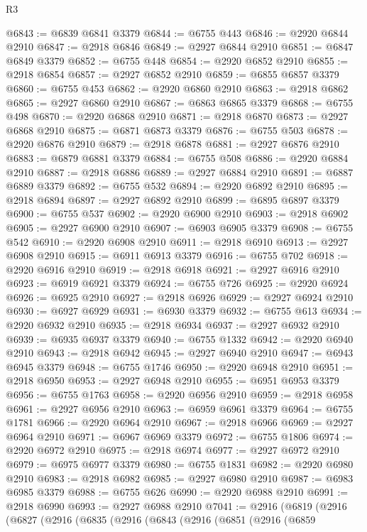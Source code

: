 \begin{lexlean}{R3}
\begin{coremodule}
@6843 := @6839 @6841 @3379
@6844 := @6755 @443
@6846 := @2920 @6844 @2910
@6847 := @2918 @6846
@6849 := @2927 @6844 @2910
@6851 := @6847 @6849 @3379
@6852 := @6755 @448
@6854 := @2920 @6852 @2910
@6855 := @2918 @6854
@6857 := @2927 @6852 @2910
@6859 := @6855 @6857 @3379
@6860 := @6755 @453
@6862 := @2920 @6860 @2910
@6863 := @2918 @6862
@6865 := @2927 @6860 @2910
@6867 := @6863 @6865 @3379
@6868 := @6755 @498
@6870 := @2920 @6868 @2910
@6871 := @2918 @6870
@6873 := @2927 @6868 @2910
@6875 := @6871 @6873 @3379
@6876 := @6755 @503
@6878 := @2920 @6876 @2910
@6879 := @2918 @6878
@6881 := @2927 @6876 @2910
@6883 := @6879 @6881 @3379
@6884 := @6755 @508
@6886 := @2920 @6884 @2910
@6887 := @2918 @6886
@6889 := @2927 @6884 @2910
@6891 := @6887 @6889 @3379
@6892 := @6755 @532
@6894 := @2920 @6892 @2910
@6895 := @2918 @6894
@6897 := @2927 @6892 @2910
@6899 := @6895 @6897 @3379
@6900 := @6755 @537
@6902 := @2920 @6900 @2910
@6903 := @2918 @6902
@6905 := @2927 @6900 @2910
@6907 := @6903 @6905 @3379
@6908 := @6755 @542
@6910 := @2920 @6908 @2910
@6911 := @2918 @6910
@6913 := @2927 @6908 @2910
@6915 := @6911 @6913 @3379
@6916 := @6755 @702
@6918 := @2920 @6916 @2910
@6919 := @2918 @6918
@6921 := @2927 @6916 @2910
@6923 := @6919 @6921 @3379
@6924 := @6755 @726
@6925 := @2920 @6924
@6926 := @6925 @2910
@6927 := @2918 @6926
@6929 := @2927 @6924 @2910
@6930 := @6927 @6929
@6931 := @6930 @3379
@6932 := @6755 @613
@6934 := @2920 @6932 @2910
@6935 := @2918 @6934
@6937 := @2927 @6932 @2910
@6939 := @6935 @6937 @3379
@6940 := @6755 @1332
@6942 := @2920 @6940 @2910
@6943 := @2918 @6942
@6945 := @2927 @6940 @2910
@6947 := @6943 @6945 @3379
@6948 := @6755 @1746
@6950 := @2920 @6948 @2910
@6951 := @2918 @6950
@6953 := @2927 @6948 @2910
@6955 := @6951 @6953 @3379
@6956 := @6755 @1763
@6958 := @2920 @6956 @2910
@6959 := @2918 @6958
@6961 := @2927 @6956 @2910
@6963 := @6959 @6961 @3379
@6964 := @6755 @1781
@6966 := @2920 @6964 @2910
@6967 := @2918 @6966
@6969 := @2927 @6964 @2910
@6971 := @6967 @6969 @3379
@6972 := @6755 @1806
@6974 := @2920 @6972 @2910
@6975 := @2918 @6974
@6977 := @2927 @6972 @2910
@6979 := @6975 @6977 @3379
@6980 := @6755 @1831
@6982 := @2920 @6980 @2910
@6983 := @2918 @6982
@6985 := @2927 @6980 @2910
@6987 := @6983 @6985 @3379
@6988 := @6755 @626
@6990 := @2920 @6988 @2910
@6991 := @2918 @6990
@6993 := @2927 @6988 @2910
@7041 := @2916
    (@6819
      (@2916
        (@6827
          (@2916
            (@6835
              (@2916
                (@6843
                  (@2916
                    (@6851
                      (@2916
                        (@6859

\end{coremodule}
\end{lexlean}
